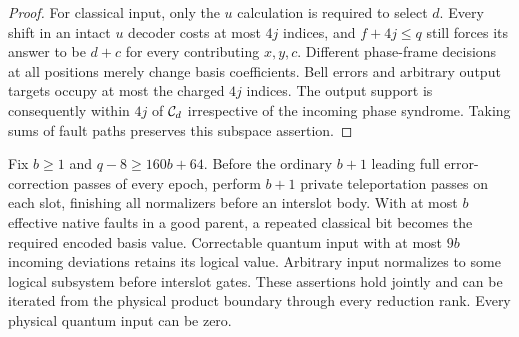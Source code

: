 \begin{proof}
For classical input, only the $u$ calculation is required to select $d$. Every shift in an intact $u$ decoder costs at most $4j$ indices, and $f+4j\le q$ still forces its answer to be $d+c$ for every contributing $x,y,c$. Different phase-frame decisions at all positions merely change basis coefficients. Bell errors and arbitrary output targets occupy at most the charged $4j$ indices. The output support is consequently within $4j$ of $\mathcal C_d$ irrespective of the incoming phase syndrome. Taking sums of fault paths preserves this subspace assertion.
\end{proof}

\begin{lemma}\label{lem:loading}
Fix $b\ge1$ and $q-8\ge160b+64$. Before the ordinary $b+1$ leading full error-correction passes of every epoch, perform $b+1$ private teleportation passes on each slot, finishing all normalizers before an interslot body. With at most $b$ effective native faults in a good parent, a repeated classical bit becomes the required encoded basis value. Correctable quantum input with at most $9b$ incoming deviations retains its logical value. Arbitrary input normalizes to some logical subsystem before interslot gates. These assertions hold jointly and can be iterated from the physical product boundary through every reduction rank. Every physical quantum input can be zero.
\end{lemma}
